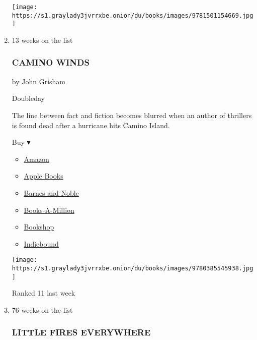 \begin{enumerate}
  \texttt{[image: https://s1.graylady3jvrrxbe.onion/du/books/images/9781501154669.jpg]}
\item
  13 weeks on the list

  \hypertarget{camino-winds}{%
  \subsubsection{CAMINO WINDS}\label{camino-winds}}

  by John Grisham

  Doubleday

  The line between fact and fiction becomes blurred when an author of
  thrillers is found dead after a hurricane hits Camino Island.

  Buy ▾

  \begin{itemize}
  \tightlist
  \item
    \href{https://www.amazon.com/dp/0385545932?tag=NYTBSREV-20\&tag=NYTBS-20}{Amazon}
  \item
    \href{https://du-gae-books-dot-nyt-du-prd.appspot.com/buy?title=CAMINO+WINDS\&author=John+Grisham}{Apple
    Books}
  \item
    \href{https://www.anrdoezrs.net/click-7990613-11819508?url=https\%3A\%2F\%2Fwww.barnesandnoble.com\%2Fw\%2F\%3Fean\%3D9780385545938}{Barnes
    and Noble}
  \item
    \href{https://www.anrdoezrs.net/click-7990613-35140?url=https\%3A\%2F\%2Fwww.booksamillion.com\%2Fp\%2FCAMINO\%2BWINDS\%2FJohn\%2BGrisham\%2F9780385545938}{Books-A-Million}
  \item
    \href{https://bookshop.org/a/3546/9780385545938}{Bookshop}
  \item
    \href{https://www.indiebound.org/book/9780385545938?aff=NYT}{Indiebound}
  \end{itemize}

  \texttt{[image: https://s1.graylady3jvrrxbe.onion/du/books/images/9780385545938.jpg]}

  Ranked 11 last week
\item
  \href{https://www.nytimes3xbfgragh.onion/2017/09/25/books/review/little-fires-everywhere-celeste-ng.html}{}

  76 weeks on the list

  \hypertarget{little-fires-everywhere}{%
  \subsubsection{LITTLE FIRES
  EVERYWHERE}\label{little-fires-everywhere}}


\end{enumerate}
